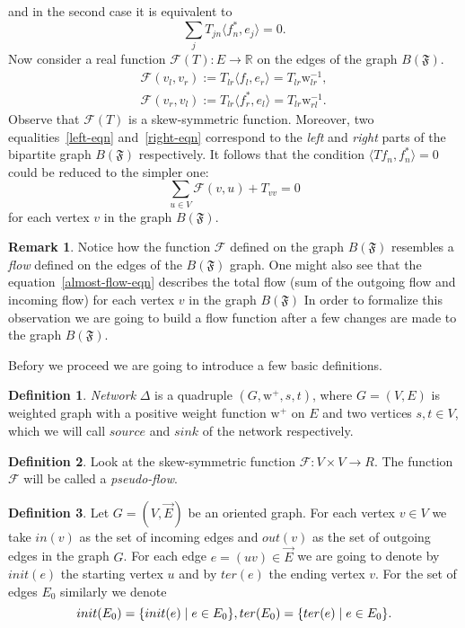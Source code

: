 \documentclass[12pt]{article}
\newcommand\inner[2]{\langle #1, #2 \rangle}
\theoremstyle{definition}
\newtheorem{remark}{Remark}
\newtheorem{definition}{Definition}
\newcommand{\fsys}{\mathfrak{F}}
\newcommand{\wt}{\mathrm{w}}
\newcommand{\wtp}{\mathrm{w}^{+}}
\newcommand{\flow}{\mathcal{F}}
\newcommand{\flowsgn}{\flow}
\newcommand{\source}{\mathit{source}}
\newcommand{\sink}{\mathit{sink}}
\newcommand{\init}{init}
\newcommand{\ter}{ter}
\newcommand{\ein}{in}
\newcommand{\eout}{out}
\newcommand{\net}{\Delta}
\numberwithin{remark}{section}
\numberwithin{theorem}{section}
\numberwithin{prop}{section}
\numberwithin{equation}{section}
\numberwithin{lemma}{section}
\numberwithin{prop_under_lemma}{lemma}
\begin{document}
    and in the second case it is equivalent to 
    \begin{equation}
        \label{right-eqn}
        \sum_j T_{jn} \inner{f^*_n}{e_j} = 0.
    \end{equation}
    Now consider a real function $\flowsgn(T): E \to \mathbb{R}$ 
    on the edges of the graph $B(\fsys)$.
    \begin{align*}
        \flowsgn(v_l, v_r) := T_{lr} \inner{f_l}{e_r} = T_{lr} \wt_{lr}^{-1},\\
        \flowsgn(v_r, v_l) := T_{lr} \inner{f^*_r}{e_l} = T_{lr} \wt_{rl}^{-1}.
    \end{align*}
    Observe that $\flowsgn(T)$ is a skew-symmetric function.
    Moreover, two equalities~\eqref{left-eqn} and~\eqref{right-eqn} correspond to the \textit{left} and \textit{right}
      parts of the bipartite graph $B(\fsys)$ respectively.
    It follows that the condition $\inner{Tf_n}{f_n^*} = 0$ could be reduced to the simpler one:
    \begin{equation}
      \label{almost-flow-eqn}
      \sum_{u \in V} \flowsgn(v, u) + T_{vv} = 0
    \end{equation}
      for each vertex $v$ in the graph $B(\fsys)$.
    \begin{remark}
      Notice how the function $\flow$ defined on the graph $B(\fsys)$ resembles
      a \emph{flow} defined on the edges of the $B(\fsys)$ graph.
      One might also see that the equation~\eqref{almost-flow-eqn} describes the total flow (sum of the outgoing flow and incoming flow) 
      for each vertex $v$ in the graph $B(\fsys)$
      In order to formalize this observation we are going to build a flow function
      after a few changes are made to the graph $B(\fsys)$.
    \end{remark}
    Befory we proceed we are going to introduce a few basic definitions.
    \begin{definition}
        \emph{Network} $\net$ is a quadruple $(G, \wtp, s, t)$, where $G = (V, E)$ is weighted graph 
        with a positive weight function $\wtp$ on $E$ and two vertices $s, t \in V$, which
        we will call $\source$ and $\sink$ of the network respectively.
    \end{definition}
    \begin{definition}
        Look at the skew-symmetric function $\flow: V \times V \to R$.
        The function $\flow$ will be called a \emph{pseudo-flow}.
    \end{definition}
    \begin{definition}
      Let $G = (V, \vec{E})$ be an oriented graph.
      For each vertex $v \in V$ we take $\ein(v)$ as the set of incoming edges
      and $\eout(v)$ as the set of outgoing edges in the graph $G$.
      For each edge $e=(uv) \in \vec{E}$ we are going to denote by $\init(e)$ the starting vertex
      $u$ and by $\ter(e)$ the ending vertex $v$.
      For the set of edges $E_0$ similarly we denote
      \[
        \init(E_0) = \{\init(e) \mid e\in E_0\},\\
        \ter(E_0) = \{\ter(e) \mid e\in E_0\}.
      \]
    \end{definition}
\end{document}
